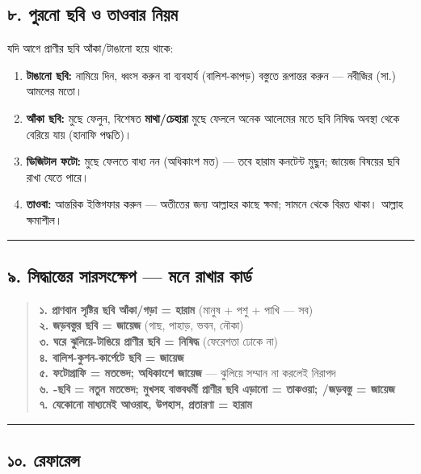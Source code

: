 \subsection*{৮. পুরনো ছবি ও তাওবার নিয়ম}

যদি আগে প্রাণীর ছবি আঁকা/টাঙানো হয়ে থাকে:

\begin{enumerate}
\item \textbf{টাঙানো ছবি:} নামিয়ে দিন, ধ্বংস করুন বা ব্যবহার্য (বালিশ-কাপড়) বস্তুতে রূপান্তর করুন — নবীজির (সা.) আমলের মতো।
\item \textbf{আঁকা ছবি:} মুছে ফেলুন, বিশেষত \textbf{মাথা/চেহারা} মুছে ফেললে অনেক আলেমের মতে ছবি নিষিদ্ধ অবস্থা থেকে বেরিয়ে যায় (হানাফি পদ্ধতি)।
\item \textbf{ডিজিটাল ফটো:} মুছে ফেলতে বাধ্য নন (অধিকাংশ মত) — তবে হারাম কনটেন্ট মুছুন; জায়েজ বিষয়ের ছবি রাখা যেতে পারে।
\item \textbf{তাওবা:} আন্তরিক ইস্তিগফার করুন — অতীতের জন্য আল্লাহর কাছে ক্ষমা; সামনে থেকে বিরত থাকা। আল্লাহ ক্ষমাশীল।
\end{enumerate}
\medskip\hrule\medskip

\subsection*{৯. সিদ্ধান্তের সারসংক্ষেপ — মনে রাখার কার্ড}

\begin{quote}
\textbf{১. প্রাণবান সৃষ্টির ছবি আঁকা/গড়া = হারাম} (মানুষ + পশু + পাখি — সব) \\
\textbf{২. জড়বস্তুর ছবি = জায়েজ} (গাছ, পাহাড়, ভবন, নৌকা) \\
\textbf{৩. ঘরে ঝুলিয়ে-টাঙিয়ে প্রাণীর ছবি = নিষিদ্ধ} (ফেরেশতা ঢোকে না) \\
\textbf{৪. বালিশ-কুশন-কার্পেটে ছবি = জায়েজ} \\
\textbf{৫. ফটোগ্রাফি = মতভেদ; অধিকাংশে জায়েজ} — ঝুলিয়ে সম্মান না করলেই নিরাপদ \\
\textbf{৬. -ছবি = নতুন মতভেদ; মুখসহ বাস্তবধর্মী প্রাণীর ছবি এড়ানো = তাকওয়া; /জড়বস্তু = জায়েজ} \\
\textbf{৭. যেকোনো মাধ্যমেই আওরাহ, উপহাস, প্রতারণা = হারাম}
\end{quote}

\medskip\hrule\medskip

\subsection*{১০. রেফারেন্স}

